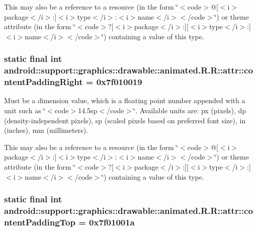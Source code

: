 This may also be a reference to a resource (in the form \char`\"{}$<$code$>$@\mbox{[}$<$i$>$package$<$/i$>$:\mbox{]}$<$i$>$type$<$/i$>$:$<$i$>$name$<$/i$>$$<$/code$>$\char`\"{}) or theme attribute (in the form \char`\"{}$<$code$>$?\mbox{[}$<$i$>$package$<$/i$>$:\mbox{]}\mbox{[}$<$i$>$type$<$/i$>$:\mbox{]}$<$i$>$name$<$/i$>$$<$/code$>$\char`\"{}) containing a value of this type. \hypertarget{classandroid_1_1support_1_1graphics_1_1drawable_1_1animated_1_1_r_1_1attr_1586bcc3945f4257beb75ca6cb28fe25}{
\subsubsection[{contentPaddingRight}]{\setlength{\rightskip}{0pt plus 5cm}static final int android::support::graphics::drawable::animated.R.R::attr::contentPaddingRight = 0x7f010019}}
\label{classandroid_1_1support_1_1graphics_1_1drawable_1_1animated_1_1_r_1_1attr_1586bcc3945f4257beb75ca6cb28fe25}


Must be a dimension value, which is a floating point number appended with a unit such as \char`\"{}$<$code$>$14.5sp$<$/code$>$\char`\"{}. Available units are: px (pixels), dp (density-independent pixels), sp (scaled pixels based on preferred font size), in (inches), mm (millimeters). 

This may also be a reference to a resource (in the form \char`\"{}$<$code$>$@\mbox{[}$<$i$>$package$<$/i$>$:\mbox{]}$<$i$>$type$<$/i$>$:$<$i$>$name$<$/i$>$$<$/code$>$\char`\"{}) or theme attribute (in the form \char`\"{}$<$code$>$?\mbox{[}$<$i$>$package$<$/i$>$:\mbox{]}\mbox{[}$<$i$>$type$<$/i$>$:\mbox{]}$<$i$>$name$<$/i$>$$<$/code$>$\char`\"{}) containing a value of this type. \hypertarget{classandroid_1_1support_1_1graphics_1_1drawable_1_1animated_1_1_r_1_1attr_1801e545953e523748b9413fd415f5b0}{
\subsubsection[{contentPaddingTop}]{\setlength{\rightskip}{0pt plus 5cm}static final int android::support::graphics::drawable::animated.R.R::attr::contentPaddingTop = 0x7f01001a}}
\label{classandroid_1_1support_1_1graphics_1_1drawable_1_1animated_1_1_r_1_1attr_1801e545953e523748b9413fd415f5b0}


